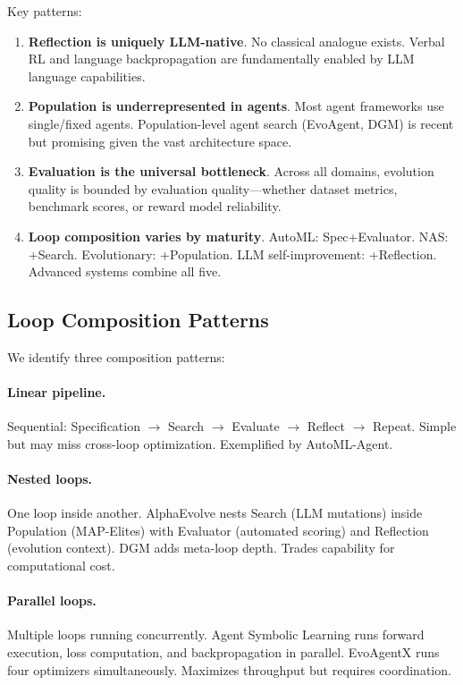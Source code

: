Key patterns:
\begin{enumerate}
    \item \textbf{Reflection is uniquely LLM-native}. No classical analogue exists. Verbal RL and language backpropagation are fundamentally enabled by LLM language capabilities.
    \item \textbf{Population is underrepresented in agents}. Most agent frameworks use single/fixed agents. Population-level agent search (EvoAgent, DGM) is recent but promising given the vast architecture space.
    \item \textbf{Evaluation is the universal bottleneck}. Across all domains, evolution quality is bounded by evaluation quality---whether dataset metrics, benchmark scores, or reward model reliability.
    \item \textbf{Loop composition varies by maturity}. AutoML: Spec+Evaluator. NAS: +Search. Evolutionary: +Population. LLM self-improvement: +Reflection. Advanced systems combine all five.
\end{enumerate}


\subsection{Loop Composition Patterns}
\label{sec:composition}

We identify three composition patterns:

\paragraph{Linear pipeline.}
Sequential: Specification $\rightarrow$ Search $\rightarrow$ Evaluate $\rightarrow$ Reflect $\rightarrow$ Repeat. Simple but may miss cross-loop optimization. Exemplified by AutoML-Agent.

\paragraph{Nested loops.}
One loop inside another. AlphaEvolve nests Search (LLM mutations) inside Population (MAP-Elites) with Evaluator (automated scoring) and Reflection (evolution context). DGM adds meta-loop depth. Trades capability for computational cost.

\paragraph{Parallel loops.}
Multiple loops running concurrently. Agent Symbolic Learning runs forward execution, loss computation, and backpropagation in parallel. EvoAgentX runs four optimizers simultaneously. Maximizes throughput but requires coordination.

